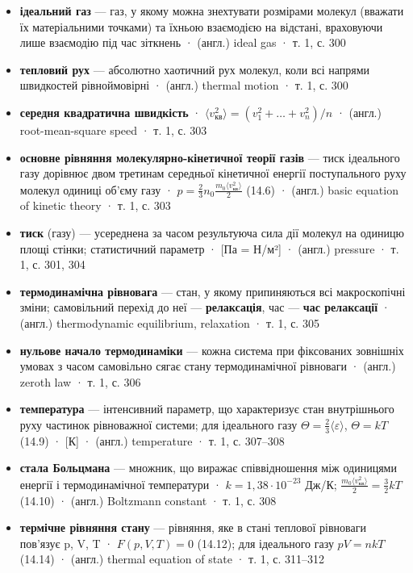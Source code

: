 \documentclass[11pt,a4paper,oneside]{book}
\newcommand{\book}{}
\begin{document}
\begin{itemize}
\item \textbf{ідеальний газ} — газ, у якому можна знехтувати розмірами молекул (вважати їх матеріальними точками) та їхньою взаємодією на відстані, враховуючи лише взаємодію під час зіткнень · (англ.) ideal gas · \book{} т. 1, с. 300
\item \textbf{тепловий рух} — абсолютно хаотичний рух молекул, коли всі напрями швидкостей рівноймовірні · (англ.) thermal motion · \book{} т. 1, с. 300
\item \textbf{середня квадратична швидкість} · $\langle v_{\text{кв}}^2\rangle = (v_1^2+\ldots+v_n^2)/n$ · (англ.) root-mean-square speed · \book{} т. 1, с. 303
\item \textbf{основне рівняння молекулярно-кінетичної теорії газів} — тиск ідеального газу дорівнює двом третинам середньої кінетичної енергії поступального руху молекул одиниці об'єму газу · $p = \tfrac23 n_0 \tfrac{m_0\langle v_{\text{кв}}^2\rangle}{2}$ (14.6) · (англ.) basic equation of kinetic theory · \book{} т. 1, с. 303
\item \textbf{тиск} (газу) — усереднена за часом результуюча сила дії молекул на одиницю площі стінки; статистичний параметр · [Па = Н/м²] · (англ.) pressure · \book{} т. 1, с. 301, 304
\item \textbf{термодинамічна рівновага} — стан, у якому припиняються всі макроскопічні зміни; самовільний перехід до неї — \textbf{релаксація}, час — \textbf{час релаксації} · (англ.) thermodynamic equilibrium, relaxation · \book{} т. 1, с. 305
\item \textbf{нульове начало термодинаміки} — кожна система при фіксованих зовнішніх умовах з часом самовільно сягає стану термодинамічної рівноваги · (англ.) zeroth law · \book{} т. 1, с. 306
\item \textbf{температура} — інтенсивний параметр, що характеризує стан внутрішнього руху частинок рівноважної системи; для ідеального газу $\Theta = \tfrac23\langle\varepsilon\rangle$, $\Theta = kT$ (14.9) · [К] · (англ.) temperature · \book{} т. 1, с. 307–308
\item \textbf{стала Больцмана} — множник, що виражає співвідношення між одиницями енергії і термодинамічної температури · $k = 1{,}38\cdot10^{-23}$ Дж/К; $\tfrac{m_0\langle v_{\text{кв}}^2\rangle}{2} = \tfrac32kT$ (14.10) · (англ.) Boltzmann constant · \book{} т. 1, с. 308
\item \textbf{термічне рівняння стану} — рівняння, яке в стані теплової рівноваги пов'язує p, V, T · $F(p,V,T)=0$ (14.12); для ідеального газу $pV = nkT$ (14.14) · (англ.) thermal equation of state · \book{} т. 1, с. 311–312

\end{itemize}
\end{document}
